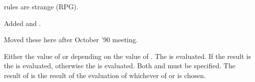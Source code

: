 %
\begin{optPrivate}
     rules are strange (RPG).

    Added  and .

    Moved these here after October '90 meeting.
\end{optPrivate}
%
\begin{optDefinition}
%
%
\Syntax
{}%
%
\result%
Either the value of  or  depending on the
value of .
%
\remarks%
The  is evaluated.  If the result is \true{} the
 is evaluated, otherwise the  is evaluated.
Both  and  must be specified.  The result
of  is the result of the evaluation of whichever of
 or  is chosen.


\end{optDefinition}
